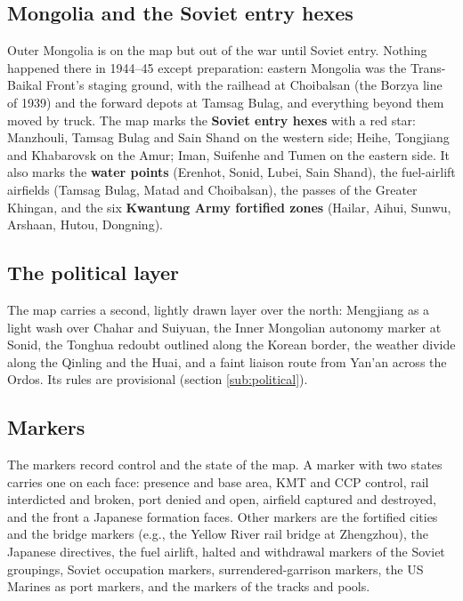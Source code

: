 \documentclass[11pt]{article}
\begin{document}
\subsection{Mongolia and the Soviet entry hexes}\label{sub:mongolia-map}
Outer Mongolia is on the map but out of the war until Soviet entry. Nothing happened there in 1944--45 except preparation: eastern Mongolia was the Trans-Baikal Front's staging ground, with the railhead at Choibalsan (the Borzya line of 1939) and the forward depots at Tamsag Bulag, and everything beyond them moved by truck. The map marks the \textbf{Soviet entry hexes} with a red star: Manzhouli, Tamsag Bulag and Sain Shand on the western side; Heihe, Tongjiang and Khabarovsk on the Amur; Iman, Suifenhe and Tumen on the eastern side. It also marks the \textbf{water points} (Erenhot, Sonid, Lubei, Sain Shand), the fuel-airlift airfields (Tamsag Bulag, Matad and Choibalsan), the passes of the Greater Khingan, and the six \textbf{Kwantung Army fortified zones} (Hailar, Aihui, Sunwu, Arshaan, Hutou, Dongning).

\subsection{The political layer}
The map carries a second, lightly drawn layer over the north: Mengjiang as a light wash over Chahar and Suiyuan, the Inner Mongolian autonomy marker at Sonid, the Tonghua redoubt outlined along the Korean border, the weather divide along the Qinling and the Huai, and a faint liaison route from Yan'an across the Ordos. Its rules are provisional (section \ref{sub:political}).

\subsection{Markers}\label{sub:markers}
The markers record control and the state of the map. A marker with two states carries one on each face: presence and base area, KMT and CCP control, rail interdicted and broken, port denied and open, airfield captured and destroyed, and the front a Japanese formation faces. Other markers are the fortified cities and the bridge markers (e.g., the Yellow River rail bridge at Zhengzhou), the Japanese directives, the fuel airlift, halted and withdrawal markers of the Soviet groupings, Soviet occupation markers, surrendered-garrison markers, the US Marines as port markers, and the markers of the tracks and pools.

\end{document}
